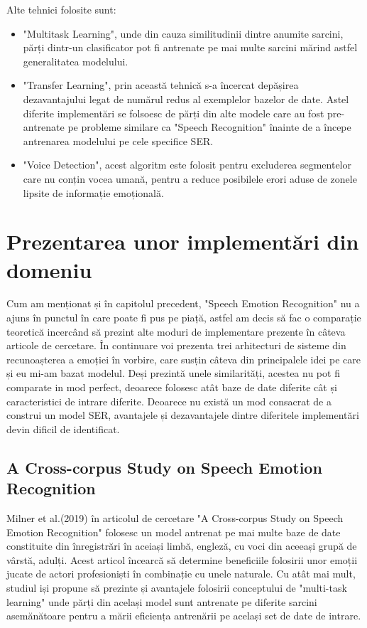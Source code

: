\documentclass[a4paper,12pt]{book}
\begin{document}
						Alte tehnici folosite sunt: 
						\begin{itemize}
							\setlength\topsep{0pt}
							\setlength\itemsep{0pt}
							\setlength{\itemindent}{1cm}
							\item "Multitask Learning", unde din cauza similitudinii dintre anumite sarcini, părți dintr-un clasificator pot fi antrenate pe mai multe sarcini mărind astfel generalitatea modelului.
							\item "Transfer Learning", prin această tehnică s-a încercat depășirea dezavantajului legat de numărul redus al exemplelor bazelor de date. Astel diferite implementări se folsoesc de părți din alte modele care au fost pre-antrenate pe probleme similare ca "Speech Recognition" înainte de a începe antrenarea modelului pe cele specifice SER.
							\item "Voice Detection", acest algoritm este folosit pentru excluderea segmentelor care nu conțin vocea umană, pentru a reduce posibilele erori aduse de zonele lipsite de informație emoțională. 					
					\end{itemize}
				
				
				\section{Prezentarea unor implementări din domeniu} \label{papers}
					Cum am menționat și în capitolul precedent, "Speech Emotion Recognition" nu a ajuns în punctul în care poate fi pus pe piață, astfel am decis să fac o comparație teoretică incercând să prezint alte moduri de implementare prezente în câteva articole de cercetare. În continuare voi prezenta trei arhitecturi de sisteme din recunoașterea a emoției în vorbire, care susțin câteva din principalele idei pe care și eu mi-am bazat modelul. Deși prezintă unele similarități, acestea nu pot fi comparate in mod perfect, deoarece folosesc atât baze de date diferite cât și caracteristici de intrare diferite. Deoarece nu există un mod consacrat de a construi un model SER, avantajele și dezavantajele dintre diferitele implementări devin dificil de identificat. \par		
					
					\subsection{A Cross-corpus Study on Speech Emotion Recognition} \label{prez_multi_domain}
					
					
					Milner et al.(2019) în articolul de cercetare "A Cross-corpus Study on Speech Emotion Recognition" \cite{multi-domain} folosesc un model antrenat pe mai multe baze de date constituite din înregistrări în aceiași limbă, engleză, cu voci din aceeași grupă de vârstă, adulți. Acest articol încearcă să determine beneficiile folosirii  unor emoții jucate de actori profesioniști în combinație cu unele naturale. Cu atât mai mult, studiul iși propune să prezinte și avantajele folosirii conceptului de "multi-task learning" unde părți din același model sunt antrenate pe diferite sarcini asemănătoare pentru a mării eficiența antrenării pe același set de date de intrare. \par
					
\end{document}
